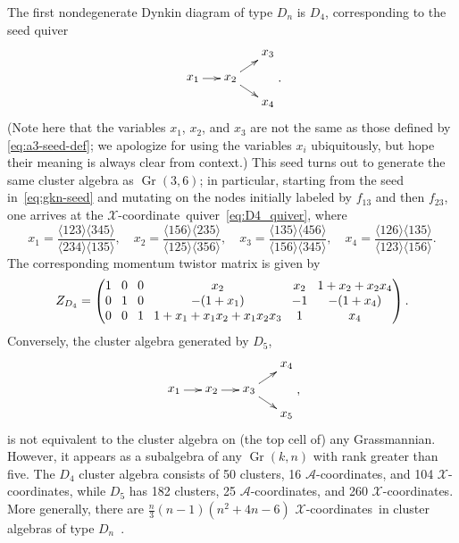 \documentclass[12pt]{article}
\DeclareMathOperator{\Gr}{Gr}
\def\ket#1{\langle #1 \rangle}
\def\xcoord{$\mathcal{X}$-coordinate}
\def\xcoords{$\mathcal{X}$-coordinates}
\def\acoords{$\mathcal{A}$-coordinates}
\begin{document}
The first nondegenerate Dynkin diagram of type $D_n$ is $D_4$, corresponding to the seed quiver
\begin{equation} \label{eq:D4_quiver}
    \begin{gathered}
    \begin{xy} 0;<1pt,0pt>:<0pt,-1pt>::
      (0,20) *+{x_1} ="1",
      (30,20) *+{x_2} ="2",
      (60,0) *+{x_3} ="3",
      (60,40) *+{x_4} ="4",
      "1", {\ar"2"},
      "2", {\ar"3"},
      "2", {\ar"4"},
    \end{xy}
    \end{gathered} .
\end{equation}
(Note here that the variables $x_1$, $x_2$, and $x_3$ are not the same as those defined by \eqref{eq:a3-seed-def}; we apologize for using the variables $x_i$ ubiquitously, but hope their meaning is always clear from context.) This seed turns out to generate the same cluster algebra as $\Gr(3,6)$; in particular, starting from the seed in~\eqref{eq:gkn-seed} and mutating on the nodes initially labeled by $f_{13}$ and then $f_{23}$, one arrives at the \xcoord\ quiver~\eqref{eq:D4_quiver}, where
\begin{equation}\label{eq:d4-seed-def}
x_1 = \frac{\ket{123}\ket{345}}{\ket{234}\ket{135}}, \quad x_2 = \frac{\ket{156}\ket{235}}{\ket{125}\ket{356}}, \quad x_3 = \frac{\ket{135}\ket{456}}{\ket{156}\ket{345}}, \quad x_4 = \frac{\ket{126}\ket{135}}{\ket{123}\ket{156}}.
\end{equation}
The corresponding momentum twistor matrix is given by
\begin{equation}
Z_{D_4} = 
\begingroup
\setlength\arraycolsep{4pt}
\begin{pmatrix} 
 1 & 0 & 0 & x_2 & x_2 & 1+x_2+x_2 x_4 \\
 0 & 1 & 0 & -(1+x_1) & -1 & - (1+x_4) \\
 0 & 0 & 1 & 1 + x_1 + x_1 x_2 + x_1 x_2 x_3 & 1 & x_4
 \end{pmatrix}
\endgroup .
\end{equation}
Conversely, the cluster algebra generated by $D_5$,
\begin{equation}\label{def:D5}
    \begin{gathered}
    \begin{xy} 0;<1pt,0pt>:<0pt,-1pt>::
      (0,20) *+{x_1} ="1",
      (30,20) *+{x_2} ="2",
      (60,20) *+{x_3} ="3",
      (90,0) *+{x_4} ="4",
      (90,40) *+{x_5} ="5",
      "1", {\ar"2"},
      "2", {\ar"3"},
      "3", {\ar"4"},
      "3", {\ar"5"},
    \end{xy}
    \end{gathered} ,
\end{equation}
is not equivalent to the cluster algebra on (the top cell of) any Grassmannian. However, it appears as a subalgebra of any $\Gr(k,n)$ with rank greater than five. The $D_4$ cluster algebra consists of 50 clusters, 16 \acoords, and 104 \xcoords, while $D_5$ has 182 clusters, 25 \acoords, and 260 \xcoords. More generally, there are $\frac{n}{3}(n-1)(n^2+4n-6)$ \xcoords\ in cluster algebras of type $D_n$~\cite{2018arXiv180302492S}. 
\end{document}
